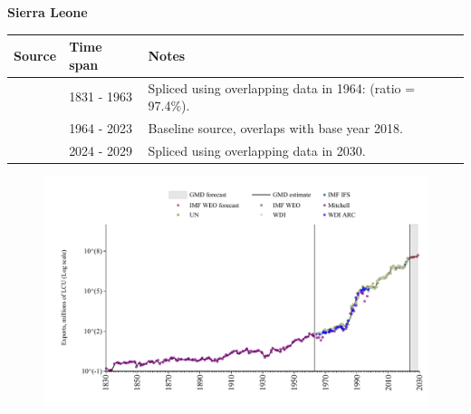 \documentclass[12pt,a4paper,landscape]{article}
\begin{document}
\begin{adjustbox}{max totalsize={\paperwidth}{\paperheight},center}
\begin{minipage}[t][\textheight][t]{\textwidth}
\vspace*{0.5cm}
{}
\begin{center}
{\Large\bfseries Sierra Leone}
\end{center}
\vspace{0.5cm}
\begin{table}[H]
\centering
\small
\begin{tabular}{|l|l|l|}
\hline
\textbf{Source} & \textbf{Time span} & \textbf{Notes} \\
\hline
\rowcolor{white}\cite{Mitchell}& 1831 - 1963 &Spliced using overlapping data in 1964: (ratio = 97.4\%).\\
\rowcolor{lightgray}\cite{WDI}& 1964 - 2023 &Baseline source, overlaps with base year 2018.\\
\rowcolor{white}\cite{IMF_WEO_forecast}& 2024 - 2029 &Spliced using overlapping data in 2030.\\
\hline
\end{tabular}
\end{table}
\begin{figure}[H]
\centering
\includegraphics[width=\textwidth,height=0.6\textheight,keepaspectratio]{graphs/SLE_exports.pdf}
\end{figure}
\end{minipage}
\end{adjustbox}
\end{document}
